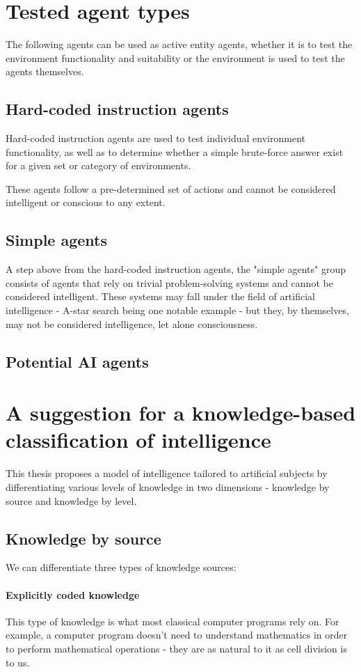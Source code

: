 \documentclass[masterthesis]{fer}
\begin{document}
\section{Tested agent types}
The following agents can be used as active entity agents, whether it is to test the environment functionality and suitability or the environment is used to test the agents themselves.
\subsection{Hard-coded instruction agents}
Hard-coded instruction agents are used to test individual environment functionality, as well as to determine whether a simple brute-force answer exist for a given set or category of environments.

These agents follow a pre-determined set of actions and cannot be considered intelligent or conscious to any extent.
\subsection{Simple agents}
A step above from the hard-coded instruction agents, the "simple agents" group consists of agents that rely on trivial problem-solving systems and cannot be considered intelligent.
These systems may fall under the field of artificial intelligence - A-star search being one notable example -
but they, by themselves, may not be considered intelligence, let alone consciousness.
\subsection{Potential AI agents}
\section{A suggestion for a knowledge-based classification of intelligence}
\label{sec:knowledge_based_classification}
This thesis proposes a model of intelligence tailored to artificial subjects
by differentiating various levels of knowledge in two dimensions - knowledge by source and knowledge by level.
\subsection{Knowledge by source}
We can differentiate three types of knowledge sources:
\paragraph{Explicitly coded knowledge}
This type of knowledge is what most classical computer programs rely on. For example, a computer program doesn't need to understand mathematics in order to perform mathematical operations - they are as natural to it as cell division is to us.
\end{document}

